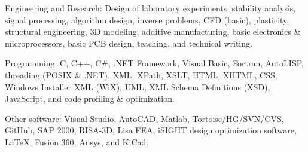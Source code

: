 \documentclass{resume}
\begin{document}
    \begin{bulletedlist}
		
        \item Engineering and Research: Design of laboratory experiments,
                        stability analysis,
                        signal processing,
                        algorithm design,
                        inverse problems,
                        CFD (basic),
                        plasticity,
                        structural engineering,
                        3D modeling,
                        additive manufacturing,
                        basic electronics \& microprocessors,
                        basic PCB design,
                        teaching,
                        and technical writing.
                        
        \item Programming: C,
                        C++,
                        C\#,
                        .NET Framework,
                        Visual Basic,
                        Fortran,
                        AutoLISP,
                        threading (POSIX \& .NET),
                        XML,
                        XPath,
                        XSLT,
                        HTML,
                        XHTML,
                        CSS,
                        Windows Installer XML (WiX),
                        UML,
                        XML Schema Definitions (XSD),
                        JavaScript,
                        and code profiling \& optimization.
                        
        \item Other software: Visual Studio,
                        AutoCAD,
                        Matlab,
                        Tortoise/HG/SVN/CVS,
                        GitHub,
                        SAP 2000,
                        RISA-3D,
                        Lisa FEA,
                        iSIGHT design optimization software,
                        LaTeX,
                        Fusion 360,
                        Ansys,
                        and KiCad.
                        
	\end{bulletedlist}
	

    
\end{document}
